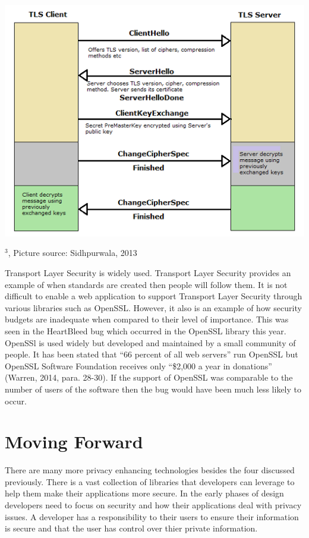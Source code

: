 \documentclass[12pt]{article}
\def\inst#1{$^{#1}$}
\begin{document}
\includegraphics{tls-handshake}
 \begin{center}
{\footnotesize
\inst{3}, Picture source: Sidhpurwala, 2013}
\end{center}

 Transport Layer Security is widely used. Transport Layer Security provides an example of when standards are created then people will follow them. It is not difficult to enable a web application to support Transport Layer Security through various libraries such as OpenSSL. However, it also is an example of how security budgets are inadequate when compared to their level of importance. This was seen in the HeartBleed bug which occurred in the OpenSSL library this year. OpenSSl is used widely but developed and maintained by a small community of people. It has been stated that ``66 percent of all web servers'' run OpenSSL but OpenSSL Software Foundation receives only ``\$2,000 a year in donations'' (Warren, 2014, para. 28-30). If the support of OpenSSL was comparable to the number of users of the software then the bug would have been much less likely to occur.

\section{Moving Forward}\label{sec:moving-forward}
There are many more privacy enhancing technologies besides the four discussed previously. There is a vast collection of libraries that developers can leverage to help them make their applications more secure. In the early phases of design developers need to focus on security and how their applications deal with privacy issues. A developer has a responsibility to their users to ensure their information is secure and that the user has control over thier private information. 
\end{document}
